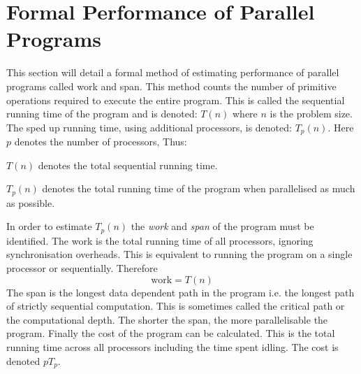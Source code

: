 \section{Formal Performance of Parallel Programs}
This section will detail a formal method of estimating performance of parallel programs called work and span. This method counts the number of primitive operations required to execute the entire program. This is called the sequential running time of the program and is denoted: $T(n)$ where $n$ is the problem size\cite{DBLP:books/daglib/para-algo}. The sped up running time, using additional processors, is denoted: $T_p(n)$. Here $p$ denotes the number of processors, Thus:
\begin{labeling}{\quad\quad}
    \item[$T(n)$] denotes the total sequential running time.
    \item[$T_p(n)$] denotes the total running time of the program when parallelised as much as possible.
\end{labeling}
In order to estimate $T_p(n)$ the \textit{work} and \textit{span} of the program must be identified. The work is the total running time of all processors, ignoring synchronisation overheads. This is equivalent to running the program on a single processor or sequentially. Therefore
\begin{equation}
    \text{work} = T(n)
\end{equation}
The span is the longest data dependent path in the program i.e. the longest path of strictly sequential computation. This is sometimes called the critical path or the computational depth\cite{Blelloch:1996:PPA:prog-para-algo}. The shorter the span, the more parallelisable the program. Finally the cost of the program can be calculated. This is the total running time across all processors including the time spent idling. The cost is denoted $pT_p$.

